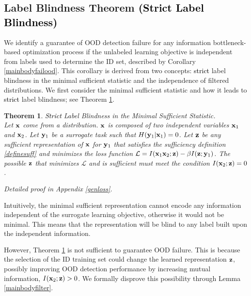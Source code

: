 \documentclass{article} %
\theoremstyle{plain}
\newtheorem{theorem}{Theorem}[section]
\theoremstyle{definition}
\theoremstyle{remark}
\begin{document}
\vspace{-2mm}\subsection{Label Blindness Theorem \textcolor{black}{(Strict Label Blindness)}}\vspace{-2mm}

We identify a guarantee of OOD detection failure for any information bottleneck-based optimization process if the unlabeled learning objective is independent from labels used to determine the ID set, described by Corollary \ref{mainbodyfailood}. This corollary is derived from two concepts: \textcolor{black}{strict} label blindness in the minimal sufficient statistic and the independence of filtered distributions. We first consider the minimal sufficient statistic and how it leads to \textcolor{black}{strict} label blindness; see Theorem \ref{mainbodygenloss}.

\begin{theorem}  \textcolor{black}{Strict} Label Blindness in the Minimal Sufficient Statistic. \\
    Let ${\mathbf{x}}$ come from a distribution. ${\mathbf{x}}$ is composed of two independent variables ${\mathbf{x}}_1$ and ${\mathbf{x}}_2$. Let ${\mathbf{y}}_1$ be a surrogate task such that $H({\mathbf{y}}_1|{\mathbf{x}}_1) = 0$. Let ${\mathbf{z}}$ be any sufficient representation of ${\mathbf{x}}$ for ${\mathbf{y}}_1$ that satisfies the sufficiency definition \ref{definesuff} and minimizes the loss function $\mathcal{L} = I({\mathbf{x}}_1 {\mathbf{x}}_2; {\mathbf{z}}) - \beta I({\mathbf{z}};{\mathbf{y}}_1)$. The possible ${\mathbf{z}}$ that minimizes $\mathcal{L}$  and is sufficient must meet the condition $I({\mathbf{x}}_2; {\mathbf{z}}) = 0$. 

    Detailed proof in Appendix \ref{genloss}.

    \label{mainbodygenloss}
\end{theorem}

Intuitively, the minimal sufficient representation cannot encode any information independent of the surrogate learning objective, otherwise it would not be minimal. This means that the representation will be blind to any label built upon the independent information. 

However, Theorem \ref{mainbodygenloss} is not sufficient to guarantee OOD failure. This is because the selection of the ID training set could change the learned representation ${\mathbf{z}}$, possibly improving OOD detection performance by increasing mutual information, $I({\mathbf{x}}_2;{\mathbf{z}}) > 0$. We formally disprove this possibility through Lemma \ref{mainbodyfilter}. 
\end{document}
